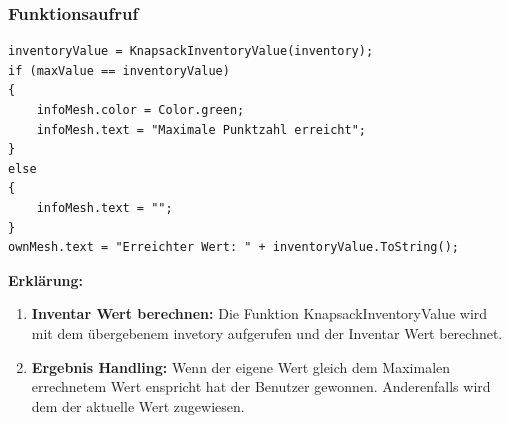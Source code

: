 \subsubsection{Funktionsaufruf}
\begin{lstlisting}[style=csharp, caption={}, label=code:aufruf]
inventoryValue = KnapsackInventoryValue(inventory);
if (maxValue == inventoryValue)
{
    infoMesh.color = Color.green;
    infoMesh.text = "Maximale Punktzahl erreicht";
}
else
{
    infoMesh.text = "";
}
ownMesh.text = "Erreichter Wert: " + inventoryValue.ToString();
\end{lstlisting}
\textbf{Erklärung:}
\begin{enumerate}
    \item \textbf{Inventar Wert berechnen:} Die Funktion KnapsackInventoryValue wird mit dem übergebenem invetory aufgerufen und der Inventar Wert berechnet.
    \item \textbf{Ergebnis Handling:} Wenn der eigene Wert gleich dem Maximalen errechnetem Wert enspricht hat der Benutzer gewonnen. Anderenfalls wird dem  der aktuelle Wert zugewiesen.
\end{enumerate}

